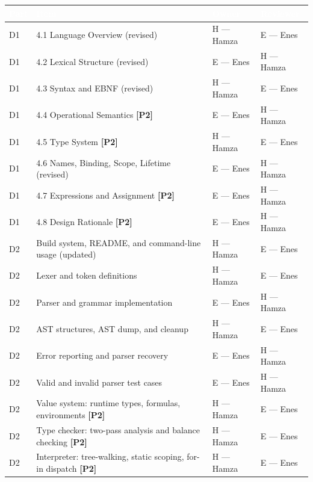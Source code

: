 \documentclass[10pt,a4paper]{article}
\newcommand{\ownerEname}{Enes}
\newcommand{\ownerHname}{Hamza}
\begin{document}
\vspace{3pt}
\small
\begin{tabularx}{\textwidth}{@{} L{1.25cm} Y L{2.0cm} L{2.0cm} @{}}
\toprule
{}
\textcolor{white}{\textbf{Part}} &
\textcolor{white}{\textbf{Item}} &
\textcolor{white}{\textbf{Owner}} &
\textcolor{white}{\textbf{Reviewer}} \\
\midrule
D1 & 4.1 Language Overview (revised) & H --- \ownerHname & E --- \ownerEname \\
D1 & 4.2 Lexical Structure (revised) & E --- \ownerEname & H --- \ownerHname \\
D1 & 4.3 Syntax and EBNF (revised) & H --- \ownerHname & E --- \ownerEname \\
D1 & 4.4 Operational Semantics \textbf{[P2]} & E --- \ownerEname & H --- \ownerHname \\
D1 & 4.5 Type System \textbf{[P2]} & H --- \ownerHname & E --- \ownerEname \\
D1 & 4.6 Names, Binding, Scope, Lifetime (revised) & E --- \ownerEname & H --- \ownerHname \\
D1 & 4.7 Expressions and Assignment \textbf{[P2]} & E --- \ownerEname & H --- \ownerHname \\
D1 & 4.8 Design Rationale \textbf{[P2]} & E --- \ownerEname & H --- \ownerHname \\
\midrule
D2 & Build system, README, and command-line usage (updated) & H --- \ownerHname & E --- \ownerEname \\
D2 & Lexer and token definitions & H --- \ownerHname & E --- \ownerEname \\
D2 & Parser and grammar implementation & E --- \ownerEname & H --- \ownerHname \\
D2 & AST structures, AST dump, and cleanup & H --- \ownerHname & E --- \ownerEname \\
D2 & Error reporting and parser recovery & E --- \ownerEname & H --- \ownerHname \\
D2 & Valid and invalid parser test cases & E --- \ownerEname & H --- \ownerHname \\
D2 & Value system: runtime types, formulas, environments \textbf{[P2]} & H --- \ownerHname & E --- \ownerEname \\
D2 & Type checker: two-pass analysis and balance checking \textbf{[P2]} & H --- \ownerHname & E --- \ownerEname \\
D2 & Interpreter: tree-walking, static scoping, for-in dispatch \textbf{[P2]} & H --- \ownerHname & E --- \ownerEname \\

\end{tabularx}
\end{document}
